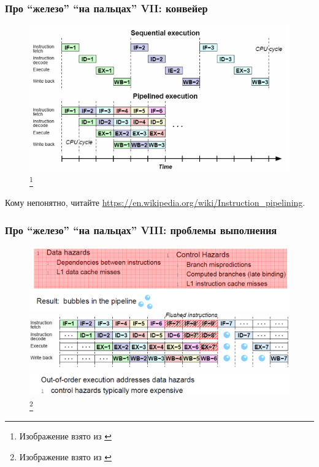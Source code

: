 \documentclass{beamer}
\begin{document}
\begin{frame}
\frametitle{Про ``железо'' ``на пальцах'' VII: конвейер}

\begin{figure}[htb]
\includegraphics[width=\textwidth,height=0.680\textheight,keepaspectratio]{superscalar.png} 
\footnote{\tiny{Изображение взято из \cite{Harizopoulos2009}}}
\end{figure}
{
\scriptsize
Кому непонятно, читайте \url{https://en.wikipedia.org/wiki/Instruction_pipelining}.
}
\end{frame}



\begin{frame}
\frametitle{Про ``железо'' ``на пальцах'' VIII: проблемы выполнения}

\begin{figure}[htb]
\includegraphics[width=\textwidth,height=0.750\textheight,keepaspectratio]{hazards.png} 
\footnote{\tiny{Изображение взято из \cite{Harizopoulos2009}}}
\end{figure}    
  
\end{frame}
\end{document}
